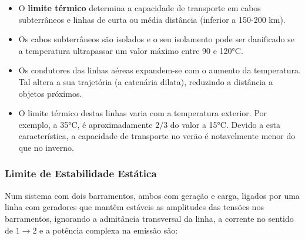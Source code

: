 \begin{itemize}
    \item O \textbf{limite térmico} determina a capacidade de transporte em cabos subterrâneos e linhas de curta ou média distância (inferior a 150-200 km).
    
    \item Os cabos subterrâneos são isolados e o seu isolamento pode ser danificado se a temperatura ultrapassar um valor máximo entre 90 e 120°C.
    
    \item Os condutores das linhas aéreas expandem-se com o aumento da temperatura. Tal altera a sua trajetória (a catenária dilata), reduzindo a distância a objetos próximos. 
    
    \item O limite térmico destas linhas varia com a temperatura exterior. Por exemplo, a 35°C, é aproximadamente $2/3$ do valor a 15°C. Devido a esta característica, a capacidade de transporte no verão é notavelmente menor do que no inverno.
\end{itemize}

\subsubsection{Limite de Estabilidade Estática}

\noindent Num sistema com dois barramentos, ambos com geração e carga, ligados por uma linha com geradores que mantêm estáveis as amplitudes das tensões nos barramentos, ignorando a admitância transversal da linha, a corrente no sentido de $1 \rightarrow 2$ e a potência complexa na emissão são:

